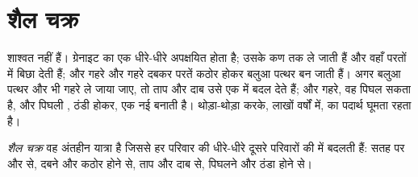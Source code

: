 \section{शैल चक्र}

 शाश्वत नहीं हैं। ग्रेनाइट का एक  धीरे-धीरे अपक्षयित होता है; उसके कण
  तक ले जाती हैं और वहाँ परतों में बिछा देती हैं; और गहरे और गहरे
दबकर परतें कठोर होकर बलुआ पत्थर बन जाती हैं। अगर बलुआ पत्थर और भी गहरे ले जाया
जाए, तो ताप और दाब उसे एक  में बदल देते हैं; और गहरे, वह पिघल सकता
है, और पिघली , ठंडी होकर, एक नई  बनाती है। थोड़ा-थोड़ा करके,
लाखों वर्षों में,  का पदार्थ
घूमता रहता है।

\begin{definition}[शैल चक्र]\label{def:g6:rocks-and-minerals:rock-cycle}
\emph{शैल चक्र} वह अंतहीन यात्रा है जिससे हर परिवार की
 धीरे-धीरे दूसरे परिवारों की  में बदलती हैं:
सतह पर  और  से, दबने और कठोर होने से, ताप
और दाब से, पिघलने और ठंडा होने से।
\end{definition}


